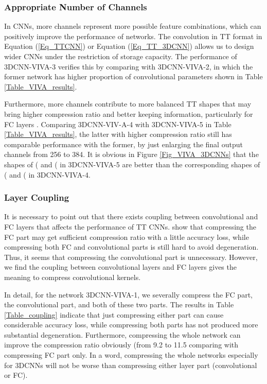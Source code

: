 \documentclass[a4paper,fleqn]{cas-dc}
\begin{document}
\subsubsection{Appropriate Number of Channels}\quad

In CNNs, more channels represent more possible feature combinations, which can positively improve the performance of networks. The convolution in TT format in  Equation (\ref{Eq_TTCNN}) or Equation (\ref{Eq_TT_3DCNN}) allows us to design wider CNNs under the restriction of storage capacity. The performance of 3DCNN-VIVA-3 verifies this by comparing with 3DCNN-VIVA-2, in which the former network has higher proportion of convolutional parameters shown in Table \ref{Table_VIVA_results}.

Furthermore, more channels contribute to more balanced TT shapes that may bring higher compression ratio and better keeping information, particularly for FC layers \citep{Novikov_2015_TT}. Comparing 3DCNN-VIV-A-4 with 3DCNN-VIVA-5 in Table \ref{Table_VIVA_results}, the latter with higher compression ratio still has comparable performance with the former, by just enlarging the final output channels from 256 to 384. It is obvious in Figure \ref{Fig_VIVA_3DCNNs} that the shapes of ( and ( in 3DCNN-VIVA-5 are better than the corresponding shapes of ( and ( in 3DCNN-VIVA-4.

\subsubsection{Layer Coupling}\quad

It is necessary to point out that there exists coupling between convolutional and FC layers that affects the performance of TT CNNs. \citet{Novikov_2015_TT,Garipov_2016_TTCNN} show that compressing the FC part may get sufficient compression ratio with a little accuracy loss, while compressing both FC and convolutional parts is still hard to avoid degeneration. Thus, it seems that compressing the convolutional part is unnecessary. However, we find the coupling between convolutional layers and FC layers gives the meaning to compress convolutional kernels.

In detail, for the network 3DCNN-VIVA-1, we severally compress the FC part, the convolutional part, and both of these two parts. The results in Table \ref{Table_coupling} indicate that just compressing either part can cause considerable accuracy loss, while compressing both parts has not produced more substantial degeneration. Furthermore, compressing the whole network can improve the compression ratio obviously (from 9.2 to 11.5 comparing with compressing FC part only. In a word, compressing the whole networks especially for 3DCNNs will not be worse than compressing either layer part (convolutional or FC).
\end{document}
